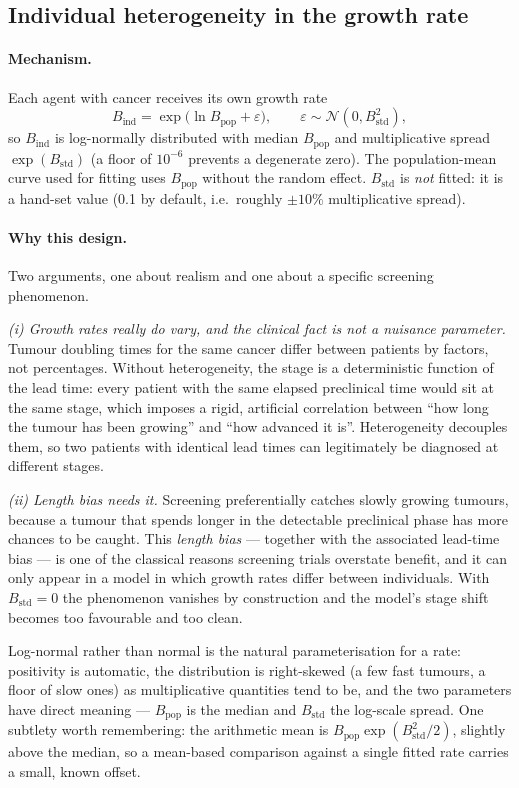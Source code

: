 \documentclass[12pt,a4paper]{article}
\newcommand{\mech}[1]{\paragraph{Mechanism.} #1}
\newcommand{\why}[1]{\paragraph{Why this design.} #1}
\begin{document}
\subsection{Individual heterogeneity in the growth rate}
\label{sec:hetero}

\mech{Each agent with cancer receives its own growth rate
\[
B_{\text{ind}} = \exp\!\bigl(\ln B_{\text{pop}} + \varepsilon\bigr), \qquad
\varepsilon \sim \mathcal{N}(0, B_{\text{std}}^2),
\]
so $B_{\text{ind}}$ is log-normally distributed with median $B_{\text{pop}}$ and multiplicative spread
$\exp(B_{\text{std}})$ (a floor of $10^{-6}$ prevents a degenerate zero). The population-mean curve used
for fitting uses $B_{\text{pop}}$ without the random effect. $B_{\text{std}}$ is \emph{not} fitted: it is a
hand-set value (0.1 by default, i.e.\ roughly $\pm10\%$ multiplicative spread).}

\why{Two arguments, one about realism and one about a specific screening phenomenon.

\emph{(i) Growth rates really do vary, and the clinical fact is not a nuisance parameter.} Tumour
doubling times for the same cancer differ between patients by factors, not percentages. Without
heterogeneity, the stage is a deterministic function of the lead time: every patient with the same
elapsed preclinical time would sit at the same stage, which imposes a rigid, artificial correlation
between ``how long the tumour has been growing'' and ``how advanced it is''. Heterogeneity decouples them,
so two patients with identical lead times can legitimately be diagnosed at different stages.

\emph{(ii) Length bias needs it.} Screening preferentially catches slowly growing tumours, because a
tumour that spends longer in the detectable preclinical phase has more chances to be caught. This
\emph{length bias} --- together with the associated lead-time bias --- is one of the classical reasons
screening trials overstate benefit, and it can only appear in a model in which growth rates differ between
individuals. With $B_{\text{std}} = 0$ the phenomenon vanishes by construction and the model's stage shift
becomes too favourable and too clean.

Log-normal rather than normal is the natural parameterisation for a rate: positivity is automatic, the
distribution is right-skewed (a few fast tumours, a floor of slow ones) as multiplicative quantities tend
to be, and the two parameters have direct meaning --- $B_{\text{pop}}$ is the median and $B_{\text{std}}$
the log-scale spread. One subtlety worth remembering: the arithmetic mean is
$B_{\text{pop}}\exp(B_{\text{std}}^2/2)$, slightly above the median, so a mean-based comparison against a
single fitted rate carries a small, known offset.}
\end{document}
